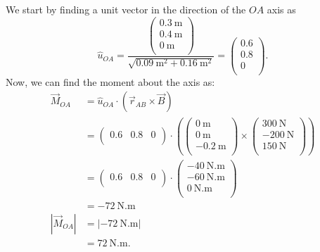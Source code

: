 \begin{derivation}
  We start by finding a unit vector in the direction of the $OA$ axis as
  \begin{equation*}
    \hat{u}_{OA} = \frac{\begin{pmatrix}
      \qty{0.3}{\m} \\
    \qty{0.4}{\m} \\
    \qty{0}{\m} \\
    \end{pmatrix}}{\sqrt{\qty{0.09}{\m^2} + \qty{0.16}{\m^2} }}  = \begin{pmatrix}
      \num{0,6}  \\
    \num{0,8} \\
    \num{0}  \\
    \end{pmatrix}
  .\end{equation*}
  Now, we can find the moment about the axis as:
  \begin{align*}
    \Vec{M}_{OA} &= \hat{u}_{OA} \cdot \left( \Vec{r}_{AB} \times \Vec{B} \right) \\
    &= \begin{pmatrix}
      \num{0,6}  & \num{0,8}  & \num{0} \\
    \end{pmatrix}\cdot \left( \begin{pmatrix}
      \qty{0}{\m}  \\
    \qty{0}{\m}  \\
    - \qty{0.2}{\m} \\
    \end{pmatrix} \times \begin{pmatrix}
      \qty{300}{\N} \\
    -\qty{200}{\N} \\
    \qty{150}{\N} \\
    \end{pmatrix} \right) \\
    &= \begin{pmatrix}
      \num{0.6}  & \num{0.8}  & \num{0} \\
    \end{pmatrix} \cdot \begin{pmatrix}
      - \qty{40}{\N.\m}  \\
    - \qty{60}{\N.\m} \\
    \qty{0}{\N.\m} \\
    \end{pmatrix} \\
    &= -\qty{72}{\N.\m} \\
    \left| \Vec{M}_{OA} \right| &= \left| - \qty{72}{\N.\m}  \right| \\
                                &= \qty{72}{\N.\m} 
  .\end{align*}
\end{derivation}

